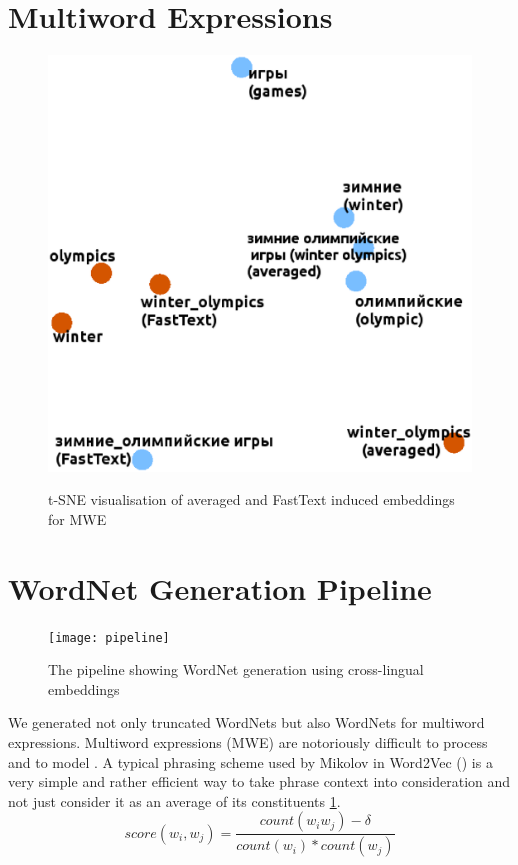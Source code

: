 \documentclass[11pt,a4paper]{article}
\begin{document}
\section{Multiword Expressions}
\begin{figure}
	
	\centering
	\small
	\includegraphics[scale=0.3]{mwe}\\
	
	\caption{t-SNE visualisation of averaged and FastText induced embeddings for MWE}
	\label{mwe}
\end{figure}

\section{WordNet Generation Pipeline}
\begin{figure}
	
	\centering
	\small
	\texttt{[image: pipeline]}\\
	
	\caption{The pipeline showing WordNet generation using cross-lingual embeddings}
	\label{pipeline}
\end{figure}


We generated not only truncated WordNets but also WordNets for multiword expressions. Multiword expressions (MWE) are notoriously difficult to process and to model \cite{sag2002multiword}. A typical phrasing scheme used by Mikolov in Word2Vec (\citeyear{mikolov-representations-2013}) is a very simple	and rather efficient way to take phrase context into consideration and not just consider it as an average of its constituents \ref{mwe}.
$$score(w_i, w_j) = \frac{count(w_iw_j) - \delta}{count(w_i) * count(w_j)}$$
\end{document}
